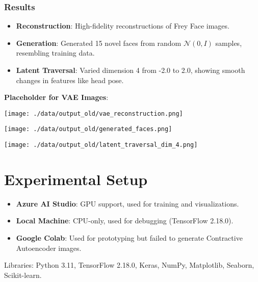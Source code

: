 \documentclass[12pt]{article}
\begin{document}
	\subsubsection{Results}
	\begin{itemize}
		\item \textbf{Reconstruction}: High-fidelity reconstructions of Frey Face images.
		\item \textbf{Generation}: Generated 15 novel faces from random \(\mathcal{N}(0, I)\) samples, resembling training data.
		\item \textbf{Latent Traversal}: Varied dimension 4 from -2.0 to 2.0, showing smooth changes in features like head pose.
	\end{itemize}
	\textbf{Placeholder for VAE Images}:
	\begin{center}
		\texttt{[image: ./data/output\_old/vae\_reconstruction.png]}
	\end{center}
	\begin{center}
		\texttt{[image: ./data/output\_old/generated\_faces.png]}
	\end{center}
	\begin{center}
		\texttt{[image: ./data/output\_old/latent\_traversal\_dim\_4.png]}
	\end{center}
	
	\section{Experimental Setup}
	\begin{itemize}
		\item \textbf{Azure AI Studio}: GPU support, used for training and visualizations.
		\item \textbf{Local Machine}: CPU-only, used for debugging (TensorFlow 2.18.0).
		\item \textbf{Google Colab}: Used for prototyping but failed to generate Contractive Autoencoder images.
	\end{itemize}
	Libraries: Python 3.11, TensorFlow 2.18.0, Keras, NumPy, Matplotlib, Seaborn, Scikit-learn.
	
\end{document}
